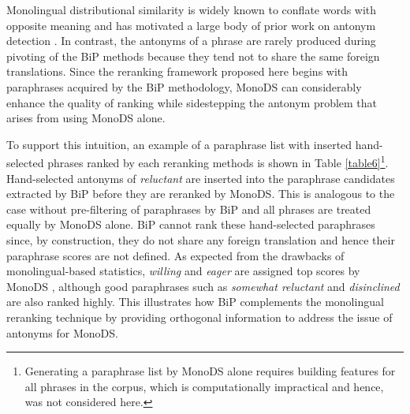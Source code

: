 \documentclass[11pt]{article}
\begin{document}
Monolingual distributional similarity is widely known to conflate words with
opposite meaning and has motivated a large body of prior work on antonym
detection
\cite{Lin03identifyingsynonyms,Lin01discoveryof,MohammadEtAl08,Mohammad_multiplealternative08,MarneffeFindingcontradictions08,Voorhees08}.
In contrast, the antonyms of a phrase are rarely produced during pivoting of the BiP methods because they tend not to share the same foreign translations.
Since the reranking framework proposed here begins with paraphrases acquired by the BiP methodology,
MonoDS can considerably enhance the quality of ranking while sidestepping the antonym problem that arises from using MonoDS alone.

To support this intuition, an example of a paraphrase list with inserted hand-selected phrases ranked by each reranking methods is shown in Table \ref{table6}\footnote{Generating a paraphrase list by MonoDS alone requires building features for all phrases in the corpus, which is computationally impractical and hence, was not considered here.}. Hand-selected antonyms of \emph{reluctant} are inserted into the paraphrase candidates extracted by BiP before they are reranked by MonoDS. This is analogous to the case without pre-filtering of paraphrases by BiP and all phrases are treated equally by MonoDS alone. BiP cannot rank these hand-selected paraphrases since, by construction, they do not share any foreign translation and hence their paraphrase scores are not defined. As expected from the drawbacks of monolingual-based statistics, \emph{willing} and \emph{eager} are assigned top scores by MonoDS%
, although good paraphrases such as \emph{somewhat reluctant} and \emph{disinclined} are also ranked highly. This illustrates how BiP complements the monolingual reranking technique by providing orthogonal information to address the issue of antonyms for MonoDS.

\end{document}
